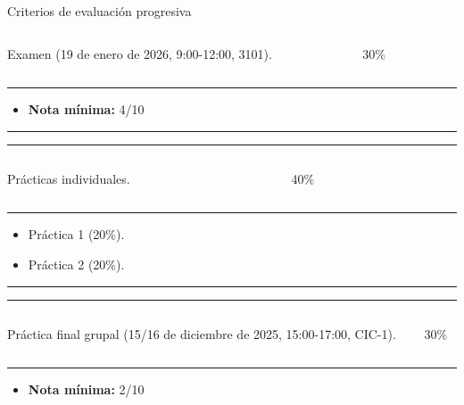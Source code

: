 \begin{frame}{Criterios de evaluación progresiva}
\begin{columns}[T]
\begin{column}{.49\textwidth}
Examen (19 de enero de 2026, 9:00-12:00, 3101).
\end{column}
\hfill
\begin{column}{.49\textwidth}
\centering
\alert{\Huge 30\%}
\end{column}
\end{columns}
\vfill
\hrule

\begin{itemize}
    \item \textbf{Nota mínima:} 4/10
\end{itemize}
\vfill
\hrule
\hrule

\vfill
\begin{columns}[T]
\begin{column}{.49\textwidth}
\vspace{0.2cm}
Prácticas individuales.
\end{column}
\hfill
\begin{column}{.49\textwidth}
\centering
\alert{\Huge 40\%}
\end{column}
\end{columns}
\vfill
\hrule

\begin{itemize}
    \item Práctica 1 (\alert{20\%}).
    \item Práctica 2 (\alert{20\%}).
\end{itemize}
\vfill

\hrule
\hrule

\vfill
\begin{columns}[T]
\begin{column}{.49\textwidth}
\vspace{0.2cm}
Práctica final grupal (15/16 de diciembre de 2025, 15:00-17:00, CIC-1).
\end{column}
\begin{column}{.49\textwidth}
\centering
\alert{\Huge 30\%}
\end{column}
\end{columns}
\vfill
\hrule

\begin{itemize}
    \item \textbf{Nota mínima:} 2/10
\end{itemize}
\end{frame}

